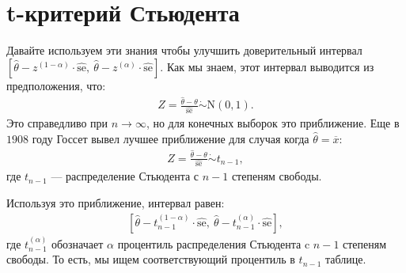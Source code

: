 \section{t-критерий Стьюдента}
Давайте используем эти знания чтобы улучшить доверительный интервал $
[ \widehat{\theta} - z^{(1 - \alpha) } \cdot \widehat{\text{se}}, \ \widehat{\theta} - z^{(\alpha)} \cdot \widehat{\text{se}}]$. Как мы знаем, этот интервал выводится из предположения, что:
\begin{gather}\label{12.17}
Z = \frac{\widehat{\theta} - \theta}{\widehat{\text{se}}} \dot{\sim} \mathrm{N}(0, 1).
\end{gather}
Это справедливо при $ n \rightarrow \infty $, но для конечных выборок это приближение. Еще в $ 1908 $ году Госсет вывел лучшее приближение для случая когда $ \widehat{\theta} = \overline{x}$:
\begin{gather}\label{12.18}
Z = \frac{\widehat{\theta} - \theta}{\widehat{\text{se}}} \dot{\sim} t_{n - 1},
\end{gather}
где $t_{n - 1}$ --- распределение Стьюдента с $n - 1$ степеням свободы. 
\begin{figure}[ht]
\end{figure}
Используя это приближение, интервал равен: 
\begin{gather}\label{12.19}
[ \widehat{\theta} - t^{(1 - \alpha)}_{n-1} \cdot \widehat{\text{se}},\ \widehat{\theta} - t^{(\alpha)}_{n-1} \cdot \widehat{\text{se}}],
\end{gather}
где $t^{(\alpha)}_{n-1}$ обозначает $\alpha$ процентиль распределения Стьюдента c $n - 1$ степеням свободы. То есть, мы ищем соответствующий процентиль в $t_{n-1}$ таблице.

